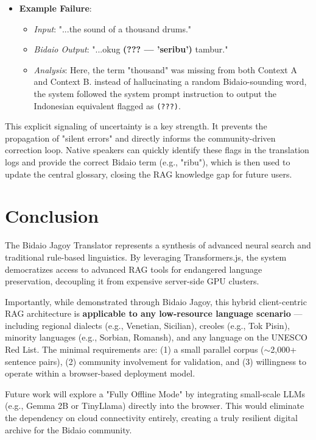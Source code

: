 \documentclass[12pt]{article}
\begin{document}
\begin{itemize}
    \item \textbf{Example Failure}:
    \begin{itemize}
        \item \textit{Input}: "...the sound of a thousand drums."
        \item \textit{Bidaio Output}: "...okug \textbf{(??? — 'seribu')} tambur."
        \item \textit{Analysis}: Here, the term "thousand" was missing from both Context A and Context B. instead of hallucinating a random Bidaio-sounding word, the system followed the system prompt instruction to output the Indonesian equivalent flagged as \texttt{(???)}.
    \end{itemize}
\end{itemize}

This explicit signaling of uncertainty is a key strength. It prevents the propagation of "silent errors" and directly informs the community-driven correction loop. Native speakers can quickly identify these flags in the translation logs and provide the correct Bidaio term (e.g., "ribu"), which is then used to update the central glossary, closing the RAG knowledge gap for future users.

\section{Conclusion}

The Bidaio Jagoy Translator represents a synthesis of advanced neural search and traditional rule-based linguistics. By leveraging Transformers.js, the system democratizes access to advanced RAG tools for endangered language preservation, decoupling it from expensive server-side GPU clusters. 

Importantly, while demonstrated through Bidaio Jagoy, this hybrid client-centric RAG architecture is \textbf{applicable to any low-resource language scenario} — including regional dialects (e.g., Venetian, Sicilian), creoles (e.g., Tok Pisin), minority languages (e.g., Sorbian, Romansh), and any language on the UNESCO Red List. The minimal requirements are: (1) a small parallel corpus ($\sim$2,000+ sentence pairs), (2) community involvement for validation, and (3) willingness to operate within a browser-based deployment model.

Future work will explore a "Fully Offline Mode" by integrating small-scale LLMs (e.g., Gemma 2B or TinyLlama) directly into the browser. This would eliminate the dependency on cloud connectivity entirely, creating a truly resilient digital archive for the Bidaio community.
\end{document}
